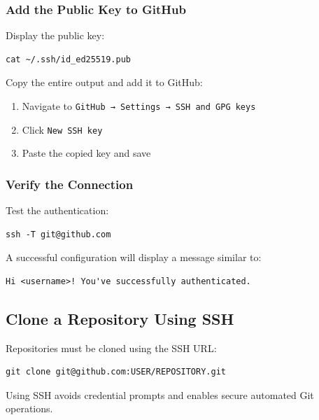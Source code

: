 \subsubsection{Add the Public Key to GitHub}

Display the public key:

\begin{lstlisting}[basicstyle=\footnotesize\ttfamily]
cat ~/.ssh/id_ed25519.pub
\end{lstlisting}

Copy the entire output and add it to GitHub:

\begin{enumerate}
\item Navigate to \texttt{GitHub → Settings → SSH and GPG keys}
\item Click \texttt{New SSH key}
\item Paste the copied key and save
\end{enumerate}

\subsubsection{Verify the Connection}

Test the authentication:

\begin{lstlisting}[basicstyle=\footnotesize\ttfamily]
ssh -T git@github.com
\end{lstlisting}

A successful configuration will display a message similar to:

\begin{lstlisting}[basicstyle=\footnotesize\ttfamily]
Hi <username>! You've successfully authenticated.
\end{lstlisting}

\subsection{Clone a Repository Using SSH}

Repositories must be cloned using the SSH URL:

\begin{lstlisting}[basicstyle=\footnotesize\ttfamily]
git clone git@github.com:USER/REPOSITORY.git
\end{lstlisting}

Using SSH avoids credential prompts and enables secure automated
Git operations.

